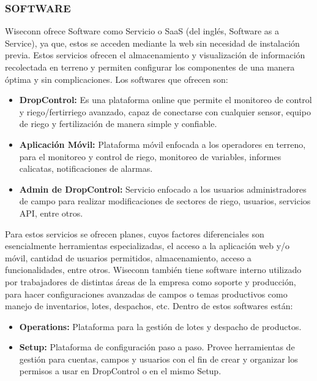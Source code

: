\subsubsection{SOFTWARE}
Wiseconn ofrece Software como Servicio o SaaS (del inglés, Software as a Service), ya que, estos se acceden mediante la web sin necesidad de instalación previa. Estos servicios ofrecen el almacenamiento y visualización de información recolectada en terreno y permiten configurar los componentes de una manera óptima y sin complicaciones. Los softwares que ofrecen son:
\begin{itemize}
    \item \textbf{DropControl:} Es una plataforma online que permite el monitoreo de control y riego/fertirriego avanzado, capaz de conectarse con cualquier sensor, equipo de riego y fertilización de manera simple y confiable.
    \item \textbf{Aplicación Móvil:} Plataforma móvil enfocada a los operadores en terreno, para el monitoreo y control de riego, monitoreo de variables, informes calicatas, notificaciones de alarmas.
    \item \textbf{Admin de DropControl:} Servicio enfocado a los usuarios administradores de campo para realizar modificaciones de sectores de riego, usuarios, servicios API, entre otros.
\end{itemize}

Para estos servicios se ofrecen planes, cuyos factores diferenciales son esencialmente herramientas especializadas, el acceso a la aplicación web y/o móvil, cantidad de usuarios permitidos, almacenamiento, acceso a funcionalidades, entre otros.
Wiseconn también tiene software interno utilizado por trabajadores de distintas áreas de la empresa como soporte y producción, para hacer configuraciones avanzadas de campos o temas productivos como manejo de inventarios, lotes, despachos, etc. Dentro de estos softwares están:
\begin{itemize}
    \item \textbf{Operations:} Plataforma para la gestión de lotes y despacho de productos.
    \item \textbf{Setup:} Plataforma de configuración paso a paso. Provee herramientas de gestión para cuentas, campos y usuarios con el fin de crear y organizar los permisos a usar en DropControl o en el mismo Setup.
\end{itemize}

